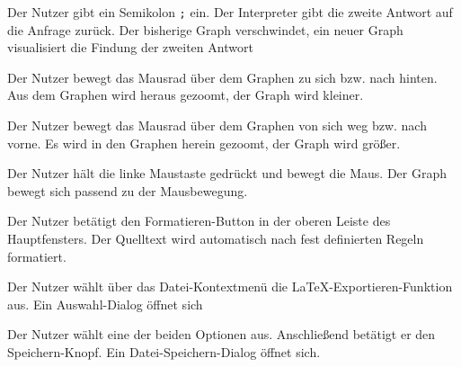 \documentclass[parskip=full,11pt,twoside]{scrartcl}
\begin{document}
{Der Nutzer gibt ein Semikolon \texttt{;} ein.}
{Der Interpreter gibt die zweite Antwort auf die Anfrage zurück. Der bisherige Graph verschwindet, ein neuer Graph visualisiert die Findung der zweiten Antwort}



{Der Nutzer bewegt das Mausrad über dem Graphen zu sich bzw. nach hinten.}
{Aus dem Graphen wird heraus gezoomt, der Graph wird kleiner.}

{Der Nutzer bewegt das Mausrad über dem Graphen von sich weg bzw. nach vorne.}
{Es wird in den Graphen herein gezoomt, der Graph wird größer.}

{Der Nutzer hält die linke Maustaste gedrückt und bewegt die Maus.}
{Der Graph bewegt sich passend zu der Mausbewegung.}



{Der Nutzer betätigt den Formatieren-Button in der oberen Leiste des Hauptfensters.}
{Der Quelltext wird automatisch nach fest definierten Regeln formatiert.}



{Der Nutzer wählt über das Datei-Kontextmenü die LaTeX-Exportieren-Funktion aus.}
{Ein Auswahl-Dialog öffnet sich}

{Der Nutzer wählt eine der beiden Optionen aus. Anschließend betätigt er den Speichern-Knopf.}
{Ein Datei-Speichern-Dialog öffnet sich.}
\end{document}
